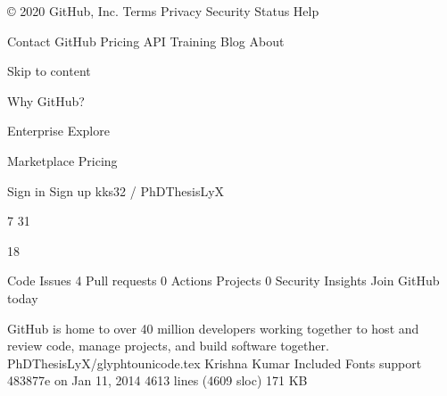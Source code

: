 

    © 2020 GitHub, Inc.
    Terms
    Privacy
    Security
    Status
    Help

    Contact GitHub
    Pricing
    API
    Training
    Blog
    About


Skip to content

    Why GitHub?
                          


                    
Enterprise
Explore
                      

                    
Marketplace
Pricing
                       


                        

Sign in
Sign up
kks32 /
PhDThesisLyX

7
31

    18

Code
Issues 4
Pull requests 0
Actions
Projects 0
Security
Insights
Join GitHub today

GitHub is home to over 40 million developers working together to host and review code, manage projects, and build software together.
PhDThesisLyX/glyphtounicode.tex
Krishna Kumar Included Fonts support 483877e on Jan 11, 2014
4613 lines (4609 sloc) 171 KB
%
%
%

